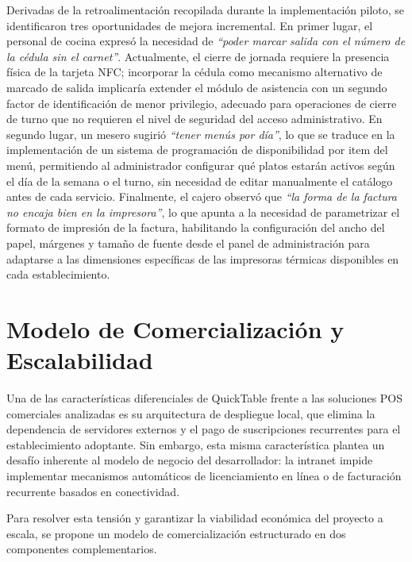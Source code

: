Derivadas de la retroalimentaci\'{o}n recopilada durante la implementaci\'{o}n piloto, se 
identificaron tres oportunidades de mejora incremental. En primer lugar, el personal de cocina 
expres\'{o} la necesidad de \textit{``poder marcar salida con el n\'{u}mero de la c\'{e}dula 
	sin el carnet''}. Actualmente, el cierre de jornada requiere la presencia f\'{i}sica de la 
tarjeta NFC; incorporar la c\'{e}dula como mecanismo alternativo de marcado de salida 
implicar\'{i}a extender el m\'{o}dulo de asistencia con un segundo factor de identificaci\'{o}n 
de menor privilegio, adecuado para operaciones de cierre de turno que no requieren el nivel 
de seguridad del acceso administrativo. En segundo lugar, un mesero sugiri\'{o} 
\textit{``tener men\'{u}s por d\'{i}a''}, lo que se traduce en la implementaci\'{o}n de un 
sistema de programaci\'{o}n de disponibilidad por item del men\'{u}, permitiendo al 
administrador configurar qu\'{e} platos estar\'{a}n activos seg\'{u}n el d\'{i}a de la semana 
o el turno, sin necesidad de editar manualmente el cat\'{a}logo antes de cada servicio. 
Finalmente, el cajero observ\'{o} que \textit{``la forma de la factura no encaja bien en la 
	impresora''}, lo que apunta a la necesidad de parametrizar el formato de impresi\'{o}n de la 
factura, habilitando la configuraci\'{o}n del ancho del papel, m\'{a}rgenes y tama\~{n}o de 
fuente desde el panel de administraci\'{o}n para adaptarse a las dimensiones espec\'{i}ficas 
de las impresoras t\'{e}rmicas disponibles en cada establecimiento.


\section{Modelo de Comercialización y Escalabilidad}

Una de las características diferenciales de QuickTable frente a las soluciones POS
comerciales analizadas es su arquitectura de despliegue local, que elimina la dependencia
de servidores externos y el pago de suscripciones recurrentes para el establecimiento
adoptante. Sin embargo, esta misma característica plantea un desafío inherente al modelo
de negocio del desarrollador: la intranet impide implementar mecanismos automáticos de
licenciamiento en línea o de facturación recurrente basados en conectividad.

Para resolver esta tensión y garantizar la viabilidad económica del proyecto a escala,
se propone un modelo de comercialización estructurado en dos componentes complementarios.

